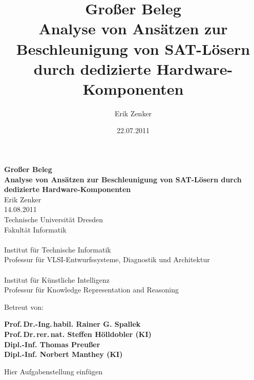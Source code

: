 \documentclass[11pt,a4paper]{article}
\title{\small{Großer Beleg}\\\Large{Analyse von Ansätzen zur Beschleunigung von SAT-Lösern durch dedizierte Hardware-Komponenten}}
\author{Erik Zenker}
\date{22.07.2011}
\begin{document}
\begin{titlepage}
        \vspace*{\bigskipamount}
        \begin{center}
                \noindent
                \textbf{\LARGE{Großer Beleg}}\\[4ex]
                \noindent%
                \textbf{\huge{Analyse von Ansätzen zur Beschleunigung von SAT-Lösern durch dedizierte Hardware-Komponenten}}\\[10ex]
                \Large Erik Zenker\\[0.5ex]
	        \Large 14.08.2011\\[4ex]
                \LARGE Technische Universität Dresden\\
                \Large Fakultät Informatik\\
                \mbox{}\\
                Institut für Technische Informatik\\
                Professur für VLSI-Entwurfssysteme, Diagnostik und Architektur\\
                                 \mbox{}\\
                        Institut für Künstliche Intelligenz\\
                        Professur  für Knowledge Representation and Reasoning
        \end{center}
\begin{flushleft}
\vfill
Betreut von:

\textbf{Prof.\,Dr.-Ing.\,habil. Rainer G. Spallek}\\
\textbf{Prof.\,Dr.\,rer.\,nat. Steffen H\"olldobler (KI)}\\
\textbf{Dipl.-Inf. Thomas Preußer}\\
\textbf{Dipl.-Inf. Norbert Manthey (KI)}


\end{flushleft}
\end{titlepage}
\newpage
\mbox{} \thispagestyle{empty}
\newpage
Hier Aufgabenstellung einfügen
\newpage

\mbox{} \thispagestyle{empty}
\newpage
\tableofcontents 
\newpage














\end{document}
